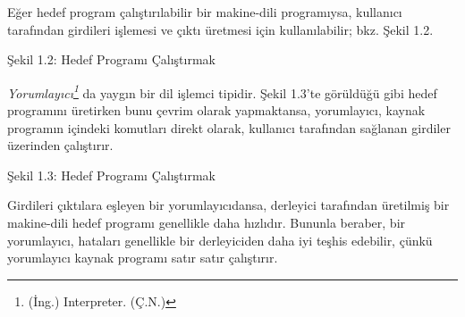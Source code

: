\documentclass{book}
\begin{document}
Eğer hedef program çalıştırılabilir bir makine-dili programıysa, kullanıcı tarafından girdileri işlemesi ve çıktı üretmesi için kullanılabilir; bkz. Şekil 1.2.

\begin{center}
\break

Şekil 1.2: Hedef Programı Çalıştırmak
\end{center}

\renewcommand{\thefootnote}{\fnsymbol{footnote}}
\textit{Yorumlayıcı\footnote{(İng.) Interpreter. (Ç.N.)}} da yaygın bir dil işlemci tipidir. Şekil 1.3'te görüldüğü gibi hedef programını üretirken bunu çevrim olarak yapmaktansa, yorumlayıcı, kaynak programın içindeki komutları direkt olarak, kullanıcı tarafından sağlanan girdiler üzerinden çalıştırır.

\begin{center}
\break

Şekil 1.3: Hedef Programı Çalıştırmak
\end{center}


Girdileri çıktılara eşleyen bir yorumlayıcıdansa, derleyici tarafından üretilmiş bir makine-dili hedef programı genellikle daha hızlıdır. Bununla beraber, bir yorumlayıcı, hataları genellikle bir derleyiciden daha iyi teşhis edebilir, çünkü yorumlayıcı kaynak programı satır satır çalıştırır.
\end{document}
